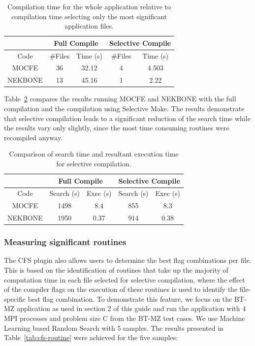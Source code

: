 \begin{table}
    \centering
    \begin{tabular}{|c | c| c | c | c |}
    \hline
      & \multicolumn{2}{c}{Full Compile} & \multicolumn{2}{|c|}{Selective Compile}\\\hline
     Code & \#Files & Time (s) & \#Files & Time (s)\\
    \hline\hline
    MOCFE	&36 &32.12& 4 &4.503\\[1ex]
    NEKBONE &13 &45.16 &1 &2.22\\[1ex]  \hline
    \end{tabular}
    \caption{Compilation time for the whole application relative to compilation time selecting only the most significant application files.}
\label{tab:cfs-recompilation}
\end{table}

Table~\ref{tab:cfs-selective-influence} compares the results running MOCFE and NEKBONE with the full compilation and the compilation using Selective Make. The results demonstrate that selective compilation leads to a significant reduction of the search time while the results vary only slightly, since the most time consuming routines were recompiled anyway.

\begin{table}
    \centering
    \begin{tabular}{|c | c| c | c | c |}
    \hline
      & \multicolumn{2}{c}{Full Compile} & \multicolumn{2}{|c|}{Selective Compile}\\\hline
     Code & Search (s) & Exec (s) & Search (s) & Exec (s)\\
    \hline\hline
    MOCFE	&1498 &8.4& 855 & 8.3\\[1ex]
    NEKBONE &1950 & 0.37 & 914 & 0.38\\\hline
    \end{tabular}
    \caption{Comparison of search time and resultant execution time for selective compilation.}
\label{tab:cfs-selective-influence}
\end{table}


\subsubsection{Measuring significant routines} \label{para:cfs-significant-routines}

The CFS plugin also allows users to determine the best flag combinations per file. This is based on the identification of routines that take up the majority of computation time in each file selected for selective compilation, where the effect of the compiler flags on the execution of these routines is used to identify the file-specific best flag combination. To demonstrate this feature, we focus on the BT-MZ application as used in section 2 of this guide and run the application with 4 MPI processes and problem size C from the BT-MZ test cases. We use Machine Learning based Random Search with 5 samples. The results presented in Table~\ref{tab:cfs-routine} were achieved for the five samples:


